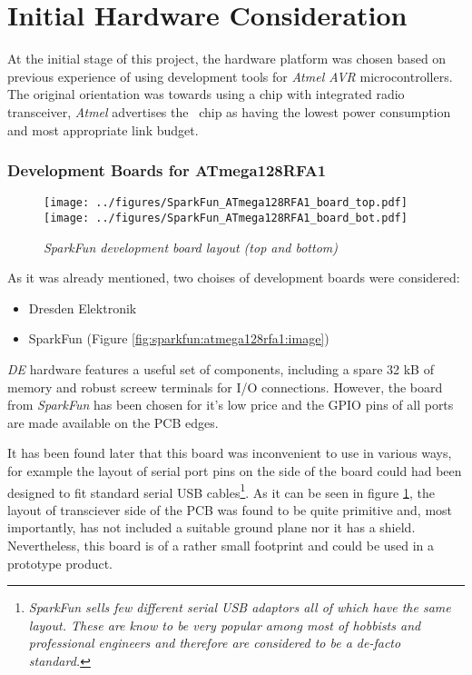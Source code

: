 \pagebreak
\section{Initial Hardware Consideration} \label{sec:RFA}

  At the initial stage of this project, the hardware platform was chosen
 based on previous experience of using development tools for \emph{Atmel
 AVR} microcontrollers. The original orientation was towards using a chip
 with integrated radio transceiver, \emph{Atmel} advertises the \RFA\ chip
 as having the lowest power consumption and most appropriate link budget.

\subsubsection{Development Boards for ATmega128RFA1}

\begin{figure}
\centering
\texttt{[image: ../figures/SparkFun\_ATmega128RFA1\_board\_top.pdf]}
\texttt{[image: ../figures/SparkFun\_ATmega128RFA1\_board\_bot.pdf]}
\caption{\emph{SparkFun development board layout (top and bottom)}} \label{fig:sparkfun:atmega128rfa1:layout}
\end{figure}

  As it was already mentioned, two choises of development boards were considered:

	\begin{itemize} \em
		\item Dresden Elektronik \cite{links:de:rcb,links:de:stb}
		\item SparkFun (Figure \ref{fig:sparkfun:atmega128rfa1:image})
	\end{itemize}

  \emph{DE} hardware features a useful set of components, including a spare 32 kB
 of memory and robust screew terminals for I/O connections. However, the board
 from \emph{SparkFun} has been chosen for it's low price and the GPIO pins of all
 ports are made available on the PCB edges.

  It has been found later that this board was inconvenient to use in various
 ways, for example the layout of serial port pins on the side of the board
 could had been designed to fit standard serial USB cables\footnote{\emph{%
 SparkFun sells few different serial USB adaptors all of which have the same
 layout. These are know to be very popular among most of hobbists and professional
 engineers and therefore are considered to be a de-facto standard.}}. As it
 can be seen in figure \ref{fig:sparkfun:atmega128rfa1:layout}, the layout of
 transciever side of the PCB was found to be quite primitive and, most importantly,
 has not included a suitable ground plane nor it has a shield. Nevertheless,
 this board is of a rather small footprint and could be used in a prototype product.

